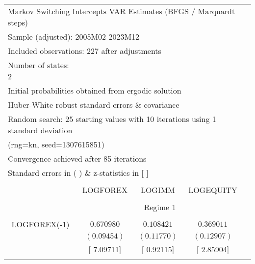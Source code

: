 \begin{tabular}{lrrrr}
\multicolumn{5}{l}{Markov Switching Intercepts VAR Estimates (BFGS / Marquardt steps)}\\
\multicolumn{3}{l}{Sample (adjusted): 2005M02 2023M12}&\multicolumn{1}{c}{}&\multicolumn{1}{c}{}\\
\multicolumn{3}{l}{Included observations: 227 after adjustments}&\multicolumn{1}{c}{}&\multicolumn{1}{c}{}\\
\multicolumn{1}{l}{Number of states: 2}&\multicolumn{1}{c}{}&\multicolumn{1}{c}{}&\multicolumn{1}{c}{}&\multicolumn{1}{c}{}\\
\multicolumn{4}{l}{Initial probabilities obtained from ergodic solution}&\multicolumn{1}{c}{}\\
\multicolumn{4}{l}{Huber-White robust standard errors \& covariance}&\multicolumn{1}{c}{}\\
\multicolumn{6}{l}{Random search: 25 starting values with 10 iterations using 1 standard deviation}\\
\multicolumn{2}{l}{(rng=kn, seed=1307615851)}&\multicolumn{1}{c}{}&\multicolumn{1}{c}{}&\multicolumn{1}{c}{}\\
\multicolumn{3}{l}{Convergence achieved after 85 iterations}&\multicolumn{1}{c}{}&\multicolumn{1}{c}{}\\
\multicolumn{3}{l}{Standard errors in ( ) \& z-statistics in [ ]}&\multicolumn{1}{c}{}&\multicolumn{1}{c}{}\\
[4.5pt] \hline \\ [-4.5pt]
\multicolumn{1}{c}{}&\multicolumn{1}{c}{LOGFOREX}&\multicolumn{1}{c}{LOGIMM}&\multicolumn{1}{c}{LOGEQUITY}&\multicolumn{1}{c}{}\\
[4.5pt] \hline \\ [-4.5pt]
\multicolumn{1}{c}{}&\multicolumn{3}{c}{Regime 1}&\multicolumn{1}{c}{}\\
[4.5pt] \hline \\ [-4.5pt]
\multicolumn{1}{c}{LOGFOREX(-1)}&\multicolumn{1}{c}{$0.670980$}&\multicolumn{1}{c}{$0.108421$}&\multicolumn{1}{c}{$0.369011$}&\multicolumn{1}{c}{}\\
\multicolumn{1}{c}{}&\multicolumn{1}{c}{$(0.09454)$}&\multicolumn{1}{c}{$(0.11770)$}&\multicolumn{1}{c}{$(0.12907)$}&\multicolumn{1}{c}{}\\
\multicolumn{1}{c}{}&\multicolumn{1}{c}{[ 7.09711]}&\multicolumn{1}{c}{[ 0.92115]}&\multicolumn{1}{c}{[ 2.85904]}&\multicolumn{1}{c}{}\\
\multicolumn{1}{c}{}&\multicolumn{1}{c}{}&\multicolumn{1}{c}{}&\multicolumn{1}{c}{}&\multicolumn{1}{c}{}\\

\end{tabular}
